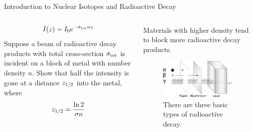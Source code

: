 \documentclass{beamer}
\begin{document}
\begin{frame}{Introduction to Nuclear Isotopes and Radioactive Decay}
\begin{columns}[T]
\begin{column}{0.6\textwidth}
\begin{equation}
I(z) = I_0 e^{-\sigma_{\rm tot} n z}
\end{equation}
Suppose a beam of radioactive decay products with total cross-section $\sigma_{\rm tot}$ is incident on a block of metal with number density $n$.  Show that half the intensity is gone at a distance $z_{\rm 1/2}$ into the metal, where
\begin{equation}
z_{\rm 1/2} = \frac{\ln 2}{\sigma n}
\end{equation}
\end{column}
\begin{column}{0.4\textwidth}
\footnotesize
Materials with higher density tend to block more radioactive decay products.
\begin{figure}
\centering
\includegraphics[width=0.95\textwidth]{figures/radioactivity.png}
\caption{\label{fig:radio8} There are three basic types of radioactive decay.}
\end{figure}
\end{column}
\end{columns}
\end{frame}
\end{document}
